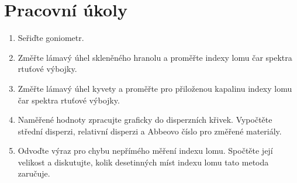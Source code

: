 \documentclass[a4paper]{article}
\author{Vladislav Wohlrath}
\begin{document}
\begin{titlepage}

\end{titlepage}

\section*{Pracovní úkoly}
\begin{enumerate}
\item Seřiďte goniometr.
\item Změřte lámavý úhel skleněného hranolu a proměřte indexy lomu čar spektra rtuťové výbojky.
\item Změřte lámavý úhel kyvety a proměřte pro přiloženou kapalinu indexy lomu čar spektra rtuťové výbojky.
\item Naměřené hodnoty zpracujte graficky do disperzních křivek. Vypočtěte střední disperzi, relativní disperzi a Abbeovo číslo pro změřené materiály.
\item Odvoďte výraz pro chybu nepřímého měření indexu lomu. Spočtěte její velikost a diskutujte, kolik desetinných míst indexu lomu tato metoda zaručuje.

\end{enumerate}










\printbibliography[title={Seznam použité literatury}]
\end{document}
